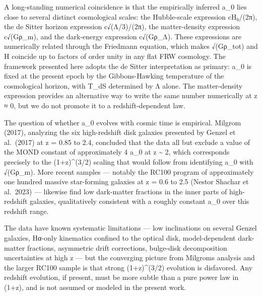 \documentclass[11pt]{article}
\begin{document}
A long-standing numerical coincidence is that the empirically inferred a\_0 lies close to several distinct cosmological scales: the Hubble-scale expression cH₀/(2π), the de Sitter horizon expression c√(Λ/3)/(2π), the matter-density expression c√(Gρ\_m), and the dark-energy expression c√(Gρ\_Λ). These expressions are numerically related through the Friedmann equation, which makes √(Gρ\_tot) and H coincide up to factors of order unity in any flat FRW cosmology. The framework presented here adopts the de Sitter interpretation as primary: a\_0 is fixed at the present epoch by the Gibbons-Hawking temperature of the cosmological horizon, with T\_dS determined by Λ alone. The matter-density expression provides an alternative way to write the same number numerically at z ≈ 0, but we do not promote it to a redshift-dependent law.

The question of whether a\_0 evolves with cosmic time is empirical. Milgrom (2017), analyzing the six high-redshift disk galaxies presented by Genzel et al.~(2017) at z = 0.85 to 2.4, concluded that the data \textquotesingle all but exclude\textquotesingle{} a value of the MOND constant of approximately 4 a\_0 at z \textasciitilde{} 2, which corresponds precisely to the (1+z)\^{}(3/2) scaling that would follow from identifying a\_0 with √(Gρ\_m). More recent samples --- notably the RC100 program of approximately one hundred massive star-forming galaxies at z = 0.6 to 2.5 (Nestor Shachar et al.~2023) --- likewise find low dark-matter fractions in the inner parts of high-redshift galaxies, qualitatively consistent with a roughly constant a\_0 over this redshift range.

The data have known systematic limitations --- low inclinations on several Genzel galaxies, Hα-only kinematics confined to the optical disk, model-dependent dark-matter fractions, asymmetric drift corrections, bulge-disk decomposition uncertainties at high z --- but the converging picture from Milgrom\textquotesingle s analysis and the larger RC100 sample is that strong (1+z)\^{}(3/2) evolution is disfavored. Any redshift evolution, if present, must be more subtle than a pure power law in (1+z), and is not assumed or modeled in the present work.
\end{document}
